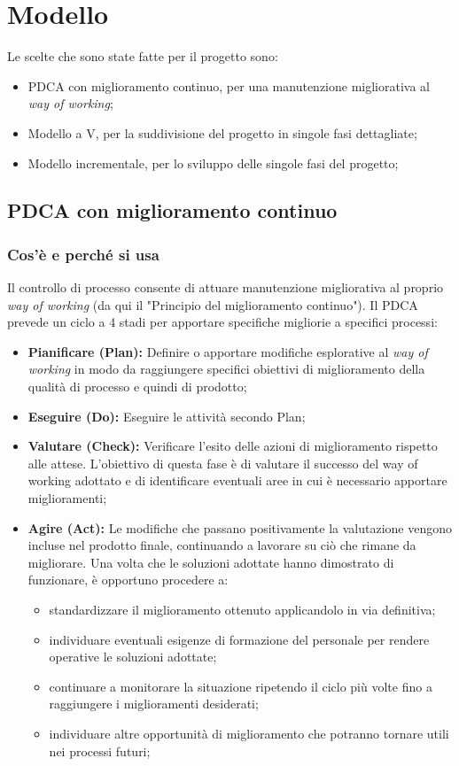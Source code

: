 \chapter{Modello}
Le scelte che sono state fatte per il progetto sono:
\begin{itemize}
    \item PDCA con miglioramento continuo, per una manutenzione migliorativa al {\it{way of working}};
    \item Modello a V, per la suddivisione del progetto in singole fasi dettagliate;
    \item Modello incrementale, per lo sviluppo delle singole fasi del progetto;
\end{itemize}

\section{PDCA con miglioramento continuo}
\subsection{Cos'è e perché si usa}
Il controllo di processo consente di attuare manutenzione migliorativa al proprio \textit{way of working} (da qui il "Principio del miglioramento continuo"). Il PDCA prevede un ciclo a 4 stadi per apportare specifiche migliorie a specifici processi:
\begin{itemize}
    \item \textbf{Pianificare (Plan):}
    Definire o apportare modifiche esplorative al \textit{way of working} in modo da raggiungere specifici obiettivi di miglioramento della qualità di processo e quindi di prodotto; 
    \item \textbf{Eseguire (Do):} Eseguire le attività secondo Plan; 
    \item \textbf{Valutare (Check):} Verificare l’esito delle azioni di miglioramento rispetto alle attese. L'obiettivo di questa fase è di valutare il successo del way of working adottato e di identificare eventuali aree in cui è necessario apportare miglioramenti;
    \item \textbf{Agire (Act):} Le modifiche che passano positivamente la valutazione vengono incluse nel prodotto finale, continuando a lavorare su ciò che rimane da migliorare. Una volta che le soluzioni adottate hanno dimostrato di funzionare, è opportuno procedere a:
    \begin{itemize}
        \item standardizzare il miglioramento ottenuto applicandolo in via definitiva;
        \item individuare eventuali esigenze di formazione del personale per rendere operative le soluzioni adottate;
        \item continuare a monitorare la situazione ripetendo il ciclo più volte fino a raggiungere i miglioramenti desiderati;
        \item individuare altre opportunità di miglioramento che potranno tornare utili nei processi futuri;
    \end{itemize}
\end{itemize}

